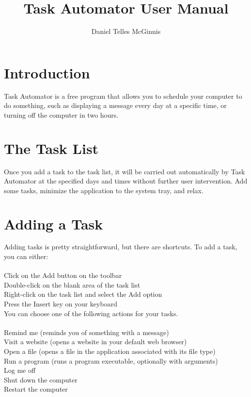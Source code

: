 \documentclass{article}
\begin{document}
\title{Task Automator User Manual}
\author{Daniel Telles McGinnis}
\maketitle
\section{Introduction}
Task Automator is a free program that allows you to schedule your computer to do something, such as displaying a message every day at a specific time, or turning off the computer in two hours.
\section{The Task List}
Once you add a task to the task list, it will be carried out automatically by Task Automator at the specified days and times without further user intervention. Add some tasks, minimize the application to the system tray, and relax.
\section{Adding a Task}
Adding tasks is pretty straightforward, but there are shortcuts. To add a task, you can either:\\
\\
Click on the Add button on the toolbar\\
Double-click on the blank area of the task list\\
Right-click on the task list and select the Add option\\
Press the Insert key  on your keyboard\\

You can choose one of the following actions for your tasks.\\
\\
Remind me (reminds you of something with a message)\\
Visit a website (opens a website in your default web browser)\\
Open a file (opens a file in the application associated with its file type)\\
Run a program (runs a program executable, optionally with arguments)\\
Log me off\\
Shut down the computer\\
Restart the computer\\
\end{document}
